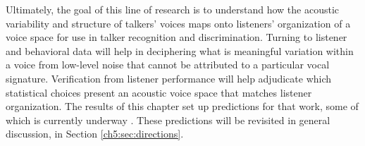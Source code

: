 Ultimately, the goal of this line of research is to understand how the acoustic variability and structure of talkers' voices maps onto listeners' organization of a voice space for use in talker recognition and discrimination. Turning to listener and behavioral data will help in deciphering what is meaningful variation within a voice from low-level noise that cannot be attributed to a particular vocal signature. Verification from listener performance will help adjudicate which statistical choices present an acoustic voice space that matches listener organization. The results of this chapter set up predictions for that work, some of which is currently underway \citep{lloy_2020_bilingual,lloy_2021_examining}. These predictions will be revisited in general discussion, in Section \ref{ch5:sec:directions}.

\endinput %

